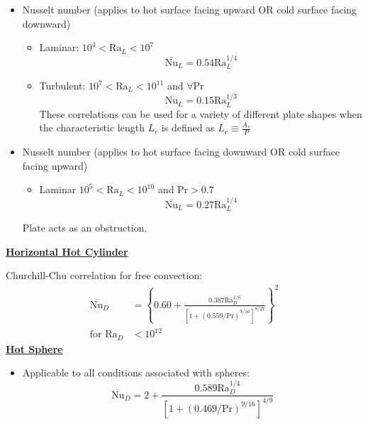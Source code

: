 \begin{itemize}
    \item Nusselt number (applies to \color{blue} hot surface facing upward \color{black} OR \color{blue} cold surface facing downward\color{black})
    \begin{itemize}
        \item Laminar: $10^4<\text{Ra}_L<10^7$
        \begin{equation*}
            \overline{\text{Nu}}_L = 0.54 \text{Ra}_{L}^{1/4}
        \end{equation*}
        \item Turbulent: $10^7<\text{Ra}_L<10^{11}$ and $\forall \text{Pr}$
        \begin{equation*}
            \overline{\text{Nu}}_L = 0.15 \text{Ra}_L^{1/3}
        \end{equation*}
        These correlations can be used for \color{blue} a variety of different plate shapes \color{black} when the characteristic length $L_c$ is defined as $L_c \equiv \frac{A_s}{P}$
    \end{itemize}
    \item Nusselt number (applies to \color{blue} hot surface facing downward \color{black} OR\color{blue} cold surface facing upward\color{black})
    \begin{itemize}
        \item Laminar $10^5 < \text{Ra}_L<10^{10}$ and $\text{Pr}>0.7$
        \begin{equation*}
            \overline{\text{Nu}}_L = 0.27 \text{Ra}_L^{1/4}
        \end{equation*}
    \end{itemize}
    Plate acts as an obstruction. 
\end{itemize}
\textbf{\underline{\color{red}Horizontal Hot Cylinder\color{black}}}

Churchill-Chu correlation for free convection:
\begin{align*}
    \overline{\text{Nu}}_D &= \left\{0.60 + \frac{0.387 \text{Ra}_D^{1/6}}{\left[1+(0.559/\text{Pr})^{9/16}\right]^{8/27}}\right\}^2\\
    \text{for }\text{Ra}_D &< 10^{12}
\end{align*}
\textbf{\underline{\color{red}Hot Sphere\color{black}}}
\begin{itemize}
    \item Applicable to all conditions associated with spheres:
    \begin{equation*}
        \overline{\text{Nu}}_D = 2 + \frac{0.589 \text{Ra}_D^{1/4}}{\left[1+(0.469/\text{Pr})^{9/16}\right]^{4/9}}
    \end{equation*}
\end{itemize}


